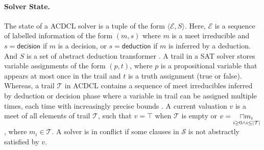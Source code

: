 \paragraph{Solver State.}  The state of a ACDCL solver is a tuple 
of the form $\langle \mathcal{E}, S \rangle$.  Here, $\mathcal{E}$ 
is a sequence of labelled information of the form $(m,s)$ where 
$m$ is a meet irreducible and $s = \mathsf{decision}$ if $m$ is a decision, 
or $s = \mathsf{deduction}$ if $m$ is inferred by a deduction. And $S$ is 
a set of abstract deduction transformer .  A trail in a SAT solver 
stores variable assignments of the form $(p, t)$, where $p$ is 
a propositional variable that appears at most once in the trail 
and $t$ is a truth assignment (true or false).  Whereas, a trail 
$\mathcal{T}$ in ACDCL contains a sequence of meet irreducibles 
inferred by deduction or decision phase where a variable in trail 
can be assigned  multiple times, each time with increasingly precise 
bounds .  A current valuation $v$ is a meet of all elements of trail
$\mathcal{T}$, such that $v = \top$ when $\mathcal{T}$ is 
empty or $v=\underset{i \geq 0 \wedge i \leq |\mathcal{T}|}{\sqcap m_i}$, where 
$m_i \in \mathcal{T}$.  A solver is in conflict if some clauses in
$\mathcal{S}$ is not abstractly satisfied by $v$.

